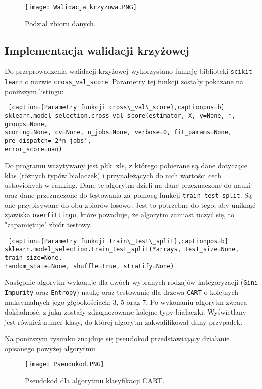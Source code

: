 \documentclass{article}
\begin{document}
\begin{figure}[ht]
    \centering
    \noindent 
    \vspace{.2cm}
    \texttt{[image: Walidacja krzyzowa.PNG]}
    \caption{Podział zbioru danych.}
    \label{fig:walidacja2}
\end{figure}

\subsection{Implementacja walidacji krzyżowej}
Do przeprowadzenia walidacji krzyżowej wykorzystano funkcję biblioteki \texttt{scikit-learn} o nazwie \texttt{cross\_val\_score}. Parametry tej funkcji zostały pokazane na poniższym listingu:\\
\begin{lstlisting} [caption={Parametry funkcji cross\_val\_score},captionpos=b]
sklearn.model_selection.cross_val_score(estimator, X, y=None, *, groups=None, 
scoring=None, cv=None, n_jobs=None, verbose=0, fit_params=None, pre_dispatch='2*n_jobs',
error_score=nan)
\end{lstlisting}

Do programu wczytywany jest plik .xls, z którego pobierane są dane dotyczące klas (różnych typów białaczek) i przynależących do nich wartości cech ustawionych w ranking. Dane te algorytm dzieli na dane przeznaczone do nauki oraz dane przeznaczone do testowania za pomocą funkcji \texttt{train\_test\_split}. Są one przypisywane do obu zbiorów losowo. Jest to potrzebne do tego, aby uniknąć zjawiska \texttt{overfittingu}, które powoduje, że algorytm zamiast uczyć się, to "zapamiętuje" zbiór testowy.\\

\begin{lstlisting} [caption={Parametry funkcji train\_test\_split},captionpos=b]
sklearn.model_selection.train_test_split(*arrays, test_size=None, train_size=None, 
random_state=None, shuffle=True, stratify=None)
\end{lstlisting}

Następnie algorytm wykonuje dla dwóch wybranych rodzajów kategoryzacji (\texttt{Gini Impurity} oraz \texttt{Entropy}) naukę oraz testowanie dla drzewa \texttt{CART} o kolejnych maksymalnych jego głębokościach: 3, 5 oraz 7. Po wykonaniu algorytm zwraca dokładność, z jaką zostały zdiagnozowane kolejne typy białaczki. Wyświetlany jest również numer klasy, do której algorytm zakwalifikował dany przypadek.

\newpage
Na poniższym rysunku znajduje się pseudokod przedstawiający działanie opisanego powyżej algorytmu.
\begin{figure}[ht]
    \centering
    \noindent 
    \vspace{.2cm}
    \texttt{[image: Pseudokod.PNG]}
    \caption{Pseudokod dla algorytmu klasyfikacji CART.}
    \label{fig:pseudokod}
\end{figure}
\end{document}
